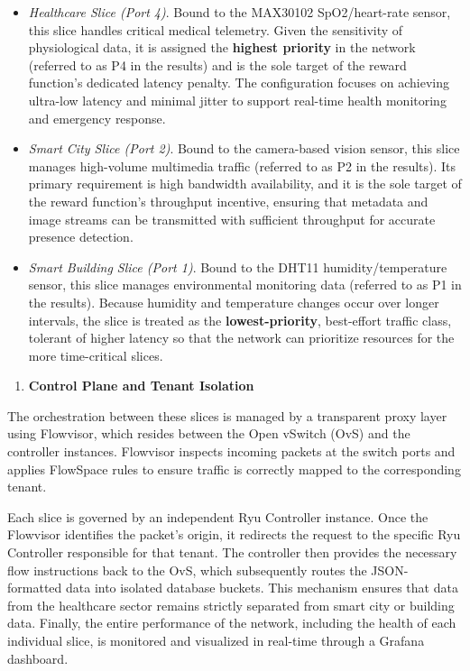 \documentclass[conference]{IEEEtran}
\begin{document}
\begin{itemize}
\item
  \emph{Healthcare Slice (Port 4)}. Bound to the MAX30102 SpO2/heart-rate sensor, this slice handles critical medical telemetry. Given the sensitivity of physiological data, it is assigned the \textbf{highest priority} in the network (referred to as P4 in the results) and is the sole target of the reward function's dedicated latency penalty. The configuration focuses on achieving ultra-low latency and minimal jitter to support real-time health monitoring and emergency response.
\item
  \emph{Smart City Slice (Port 2)}. Bound to the camera-based vision sensor, this slice manages high-volume multimedia traffic (referred to as P2 in the results). Its primary requirement is high bandwidth availability, and it is the sole target of the reward function's throughput incentive, ensuring that metadata and image streams can be transmitted with sufficient throughput for accurate presence detection.
\item
  \emph{Smart Building Slice (Port 1)}. Bound to the DHT11 humidity/temperature sensor, this slice manages environmental monitoring data (referred to as P1 in the results). Because humidity and temperature changes occur over longer intervals, the slice is treated as the \textbf{lowest-priority}, best-effort traffic class, tolerant of higher latency so that the network can prioritize resources for the more time-critical slices.
\end{itemize}

\begin{enumerate}
\def\labelenumi{\arabic{enumi})}
\setcounter{enumi}{2}
\item
  \textbf{Control Plane and Tenant Isolation}
\end{enumerate}

The orchestration between these slices is managed by a transparent proxy layer using Flowvisor, which resides between the Open vSwitch (OvS) and the controller instances. Flowvisor inspects incoming packets at the switch ports and applies FlowSpace rules to ensure traffic is correctly mapped to the corresponding tenant.

Each slice is governed by an independent Ryu Controller instance. Once the Flowvisor identifies the packet's origin, it redirects the request to the specific Ryu Controller responsible for that tenant. The controller then provides the necessary flow instructions back to the OvS, which subsequently routes the JSON-formatted data into isolated database buckets. This mechanism ensures that data from the healthcare sector remains strictly separated from smart city or building data. Finally, the entire performance of the network, including the health of each individual slice, is monitored and visualized in real-time through a Grafana dashboard.
\end{document}
